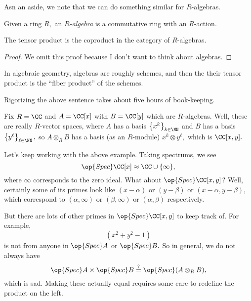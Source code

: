 Asn an aside, we note that we can do something similar for $R$-algebras.
\begin{defi}[Algebra]
	Given a ring $R,$ an \textit{$R$-algebra} is a commutative ring with an $R$-action.
\end{defi}
\begin{proposition}
	The tensor product is the coproduct in the category of $R$-algebras.
\end{proposition}
\begin{proof}
	We omit this proof because I don't want to think about algebras.
\end{proof}
In algebraic geometry, algebras are roughly schemes, and then the their tensor product is the ``fiber product'' of the schemes.
\begin{remark}
	Rigorizing the above sentence takes about five hours of book-keeping.
\end{remark}
\begin{example}
	Fix $R=\CC$ and $A=\CC[x]$ with $B=\CC[y]$ which are $R$-algebras. Well, these are really $R$-vector spaces, where $A$ has a basis $\left\{x^k\right\}_{k\in\NN}$ and $B$ has a basis $\left\{y^\ell\right\}_{\ell\in\NN},$ so $A\otimes_RB$ has a basis (as an $R$-module) $x^k\otimes y^\ell,$ which is $\CC[x,y].$
\end{example}
Let's keep working with the above example. Taking spectrums, we see
\[\op{Spec}\CC[x]\approx\CC\cup\{\infty\},\]
where $\infty$ corresponds to the zero ideal. What about $\op{Spec}\CC[x,y]$? Well, certainly some of its primes look like $(x-\alpha)$ or $(y-\beta)$ or $(x-\alpha,y-\beta),$ which correspond to $(\alpha,\infty)$ or $(\beta,\infty)$ or $(\alpha,\beta)$ respectively.

But there are lots of other primes in $\op{Spec}\CC[x,y]$ to keep track of. For example,
\[\left(x^2+y^2-1\right)\]
is not from anyone in $\op{Spec}A$ or $\op{Spec}B.$ So in general, we do not always have
\[\op{Spec}A\times\op{Spec}B\stackrel?=\op{Spec}(A\otimes_RB),\]
which is sad. Making these actually equal requires some care to redefine the product on the left.

